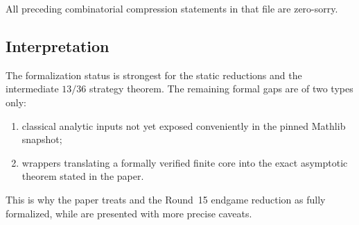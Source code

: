 All preceding combinatorial compression statements in that file are
zero-sorry.

\subsection{Interpretation}

The formalization status is strongest for the static reductions and the
intermediate $13/36$ strategy theorem.  The remaining formal gaps are of two
types only:
\begin{enumerate}
  \item classical analytic inputs not yet exposed conveniently in the pinned
  Mathlib snapshot;
  \item wrappers translating a formally verified finite core into the exact
  asymptotic theorem stated in the paper.
\end{enumerate}

This is why the paper treats 
and the Round~15 endgame reduction as fully formalized, while
 are presented with
more precise caveats.

